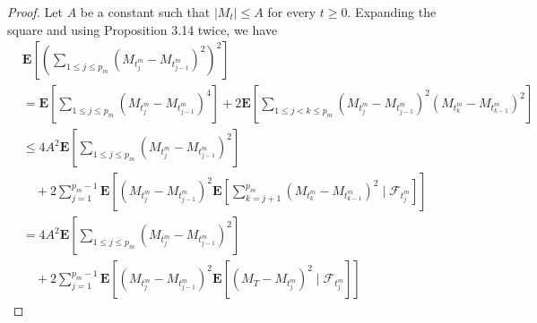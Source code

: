 \documentclass[twoside, 12pt]{book}
\numberwithin{equation}{chapter}
\def\bE{{\mathbf E}}
\def\geq{\geqslant}
\def\leq{\leqslant}
\begin{document}
\begin{proof}
		Let $A$ be a constant such that $\left|M_t\right| \leq A$ for every $t \geq 0$. Expanding the square and using Proposition 3.14 twice, we have
		$$
		\begin{aligned}
			& \bE\left[\left(\sum_{1 \leq j \leq p_m}\left(M_{t_j^m}-M_{t_{j-1}^m}\right)^2\right)^2\right] \\
			& =\bE\left[\sum_{1 \leq j \leq p_m}\left(M_{t_j^m}-M_{t_{j-1}^m}\right)^4\right]+2 \bE\left[\sum_{1 \leq j<k \leq p_m}\left(M_{t_j^m}-M_{t_{j-1}^m}\right)^2\left(M_{t_k^m}-M_{t_{k-1}^m}\right)^2\right] \\
			& \leq 4 A^2 \bE\left[\sum_{1 \leq j \leq p_m}\left(M_{t_j^m}-M_{t_{j-1}^m}\right)^2\right] \\
			& \quad+2 \sum_{j=1}^{p_m-1} \bE\left[\left(M_{t_j^m}-M_{t_{j-1}^m}\right)^2 \bE\left[\sum_{k=j+1}^{p_m}\left(M_{t_k^m}-M_{t_{k-1}^m}\right)^2 \mid \mathscr{F}_{t_j^m}\right]\right] \\
			& =4 A^2 \bE\left[\sum_{1 \leq j \leq p_m}\left(M_{t_j^m}-M_{t_{j-1}^m}\right)^2\right] \\
			& \quad+2 \sum_{j=1}^{p_m-1} \bE\left[\left(M_{t_j^m}-M_{t_{j-1}^m}\right)^2 \bE\left[\left(M_T-M_{t_j^m}\right)^2 \mid \mathscr{F}_{t_j^m}\right]\right]
		\end{aligned}
		$$
	\end{proof}
	
\end{document}
